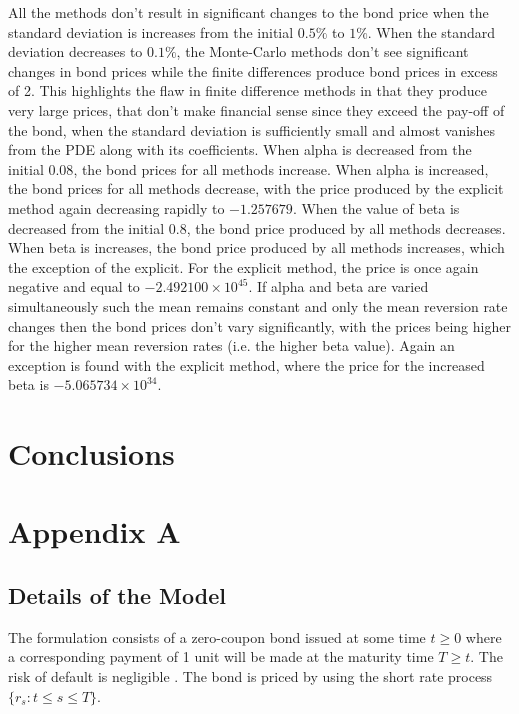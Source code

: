 \documentclass[12pt,a4paper]{article}
\begin{document}
All the methods don't result in significant changes to the bond price when the standard deviation is increases from the initial $0.5\%$ to $1\%$. When the standard deviation decreases to $0.1\%$, the Monte-Carlo methods don't see significant changes in bond prices while the finite differences produce bond prices in excess of 2. This highlights the flaw in finite difference methods in that they produce very large prices, that don't make financial sense since they exceed the pay-off of the bond, when the standard deviation is sufficiently small and almost vanishes from the PDE along with its coefficients.
When alpha is decreased from the initial $0.08$, the bond prices for all methods increase. When alpha is increased, the bond prices for all methods decrease, with the price produced by the explicit method again decreasing rapidly to $-1.257679$. When the value of beta is decreased from the initial $0.8$, the bond price produced by all methods decreases. When beta is increases, the bond price produced by all methods increases, which the exception of the explicit. For the explicit method, the price is once again negative and equal to $-2.492100\times10^{45}$. If alpha and beta are varied simultaneously such the mean remains constant and only the mean reversion rate changes then the bond prices don't vary significantly, with the prices being higher for the higher mean reversion rates (i.e. the higher beta value). Again an exception is found with the explicit method, where the price for the increased beta is $-5.065734\times10^{34}$.
\
\newpage
\section{Conclusions}
\label{sec : Concl}



\newpage

	

\newpage
\appendix
\section{Appendix A}
\label{sec: Appendix A}
\subsection{Details of the Model}
\label{subsec: Details}
The formulation consists of a zero-coupon bond issued at some time $t \geq 0$ where a corresponding payment of 1 unit will be made at the maturity time $T \geq t$. The risk of default is negligible \citep{shreve2004stochastic}. The bond is priced by using the short rate process $\{r_{s}:t \leq s \leq T\}$.
\end{document}
